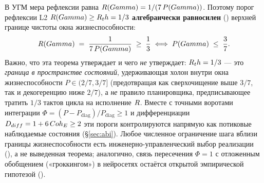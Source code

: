 В УГМ мера рефлексии равна $R(Gamma) = 1/(7\,P(Gamma))$. Поэтому порог рефлексии
L2 $R(Gamma) \ge R_th = 1/3$ \textbf{алгебраически равносилен} ()
верхней границе чистоты окна жизнеспособности:
\[
R(Gamma) \;=\; \frac{1}{7\,P(Gamma)} \;\ge\; \frac{1}{3}
\;\Longleftrightarrow\;
P(Gamma) \;\le\; \frac{3}{7}.
\]
Важно, что эта теорема утверждает и чего \emph{не} утверждает: $R_th=1/3$ ---
это \emph{граница в пространстве состояний}, удерживающая холон внутри окна
жизнеспособности $P\in(2/7,3/7]$ (предотвращая как сверхочищение выше $3/7$, так
и декогеренцию ниже $2/7$), а \emph{не} правило планировщика, предписывающее
тратить $1/3$ тактов цикла на исполнение $R$. Вместе с точными воротами
интеграции $\Phi=(P-P_{\mathrm{diag}})/P_{\mathrm{diag}}\ge 1$ и
дифференциации $D_{diff}=1+6\,Coh_E\ge 2$ эти пороги контролируются
напрямую как потиковые наблюдаемые состояния (\S\ref{sec:abi}). Любое численное
ограничение шага вблизи границы жизнеспособности есть инженерно-управленческий
выбор реализации (), а не выведенная теорема; аналогично, связь
пересечения $\Phi=1$ с отложенным обобщением («гроккингом») в нейросетях
остаётся открытой эмпирической гипотезой ().
